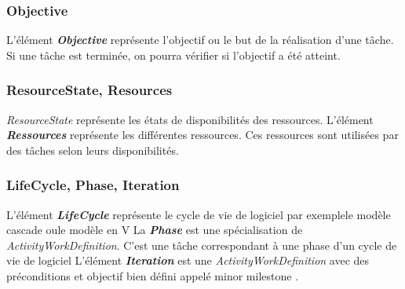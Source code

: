 \subsubsection*{Objective}
L'élément \textbf{\textit{Objective}} représente l'objectif ou le but de la réalisation d'une tâche. Si une tâche est terminée, on pourra vérifier si l'objectif a été atteint.
\subsubsection*{ResourceState, Resources}
\textit{ResourceState} représente les états de disponibilités des ressources.
L'élément \textbf{\textit{Ressources}} représente les différentes ressources. Ces ressources sont utilisées par des tâches selon leurs disponibilités.
\subsubsection*{LifeCycle, Phase, Iteration}
L'élément \textbf{\textit{LifeCycle}} représente le cycle de vie de logiciel par exemple\og le modèle cascade \fg{} ou\og le modèle en V\fg{}
La \textbf{\textit{Phase}} est une spécialisation de \textit{ActivityWorkDefinition}. C'est une tâche correspondant à une phase d'un cycle de vie de logiciel 
L'élément \textbf{\textit{Iteration}} est une \textit{ActivityWorkDefinition} avec des préconditions et objectif bien défini appelé \og minor milestone \fg{}.
